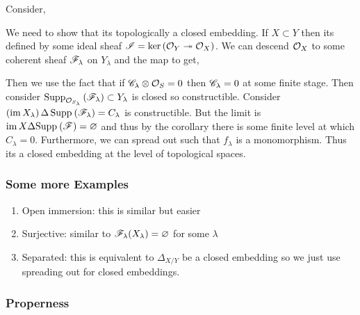 \documentclass[12pt]{article}
\begin{document}
Consider,
\begin{center}
\end{center}
We need to show that its topologically a closed embedding. If $X \subset Y$ then its defined by some ideal sheaf $\mathscr{I} = \ker{(\mathcal{O}_{Y} \twoheadrightarrow\mathcal{O}_{X})}$. We can descend $\mathcal{O}_{X}$ to some coherent sheaf $\mathscr{F}_\lambda$ on $Y_\lambda$ and the map to get,
\begin{center}
\end{center} 
Then we use the fact that if $\mathscr{C}_\lambda \otimes \mathcal{O}_{S} = 0$ then $\mathscr{C}_\lambda = 0$ at some finite stage. Then consider $\mathrm{Supp}_{\mathcal{O}_{S_\lambda}}\left(\mathscr{F}_\lambda \right) \subset Y_\lambda$ is closed so constructible. Consider $(\operatorname{\mathrm{im}}{X_\lambda}) \, \Delta \, \mathrm{Supp}_{}\left(\mathscr{F}_\lambda \right) = C_\lambda$ is constructible. But the limit is $\operatorname{\mathrm{im}}{X} \Delta \mathrm{Supp}_{}\left(\mathscr{F} \right) = \varnothing$ and thus by the corollary there is some finite level at which $C_\lambda = 0$. Furthermore, we can spread out such that $f_\lambda$ is a monomorphism. Thus its a closed embedding at the level of topological spaces. 

\subsubsection{Some more Examples}

\begin{enumerate}
\item Open immersion: this is similar but easier
\item Surjective: similar to $\mathscr{F}_\lambda(X_\lambda) = \varnothing$ for some $\lambda$
\item Separated: this is equivalent to $\Delta_{X/Y}$ be a closed embedding so we just use spreading out for closed embeddings.
\end{enumerate}

\subsubsection{Properness}
\end{document}

